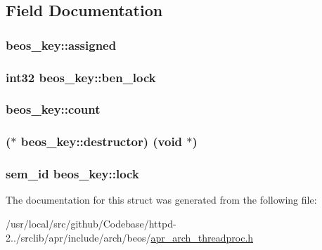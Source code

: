 \subsection{Field Documentation}
\subsubsection[{\texorpdfstring{assigned}{assigned}}]{ beos\+\_\+key\+::assigned}\hypertarget{structbeos__key_ab0c09ebde0e90dba52fcdd4675f2efcf}{}\label{structbeos__key_ab0c09ebde0e90dba52fcdd4675f2efcf}
\subsubsection[{\texorpdfstring{ben\+\_\+lock}{ben_lock}}]{\setlength{\rightskip}{0pt plus 5cm}int32 beos\+\_\+key\+::ben\+\_\+lock}\hypertarget{structbeos__key_a9efd8d597bb9f74f5e522c7d9a2a5941}{}\label{structbeos__key_a9efd8d597bb9f74f5e522c7d9a2a5941}
\subsubsection[{\texorpdfstring{count}{count}}]{ beos\+\_\+key\+::count}\hypertarget{structbeos__key_a9a8f0ecaf460a97d7833e5abf5418be9}{}\label{structbeos__key_a9a8f0ecaf460a97d7833e5abf5418be9}
\subsubsection[{\texorpdfstring{destructor}{destructor}}]{($\ast$  beos\+\_\+key\+::destructor) ({\bf void} $\ast$)}\hypertarget{structbeos__key_a04bc9158e2c7c4145f68c8fcebfccc0a}{}\label{structbeos__key_a04bc9158e2c7c4145f68c8fcebfccc0a}
\subsubsection[{\texorpdfstring{lock}{lock}}]{\setlength{\rightskip}{0pt plus 5cm}sem\+\_\+id beos\+\_\+key\+::lock}\hypertarget{structbeos__key_ae0f8c79e5147e810cf89271970fc1c89}{}\label{structbeos__key_ae0f8c79e5147e810cf89271970fc1c89}


The documentation for this struct was generated from the following file\+:\begin{DoxyCompactItemize}
\item 
/usr/local/src/github/\+Codebase/httpd-\/2../srclib/apr/include/arch/beos/\hyperlink{beos_2apr__arch__threadproc_8h}{apr\+\_\+arch\+\_\+threadproc.\+h}\end{DoxyCompactItemize}
